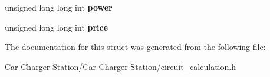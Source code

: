 \begin{DoxyCompactItemize}
\item 
\hypertarget{structcircuit__values__t_acf3a43cc8440a7fc502060e716b4f981}{unsigned long long int {\bfseries power}}\label{structcircuit__values__t_acf3a43cc8440a7fc502060e716b4f981}

\item 
\hypertarget{structcircuit__values__t_afd985d5558b116d67cbc93e4ff31bc44}{unsigned long long int {\bfseries price}}\label{structcircuit__values__t_afd985d5558b116d67cbc93e4ff31bc44}

\end{DoxyCompactItemize}


The documentation for this struct was generated from the following file\+:\begin{DoxyCompactItemize}
\item 
Car Charger Station/\+Car Charger Station/circuit\+\_\+calculation.\+h\end{DoxyCompactItemize}
